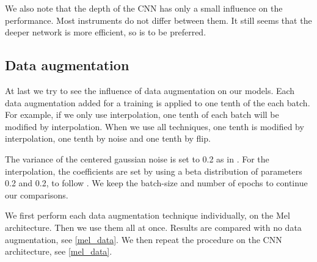 \documentclass[final]{cvpr}
\begin{document}
We also note that the depth of the CNN has only a small influence on the performance. Most instruments do not differ between them. It still seems that the deeper network is more efficient, so is to be preferred.
\subsection{Data augmentation}
At last we try to see the influence of data augmentation on our models. Each data augmentation added for a training is applied to one tenth of the each batch. For example, if we only use interpolation, one tenth of each batch will be modified by interpolation. When we use all techniques, one tenth is modified by interpolation, one tenth by noise and one tenth by flip.

The variance of the centered gaussian noise is set to 0.2 as in \cite{data_aug}. For the interpolation, the coefficients are set by using a beta distribution of parameters 0.2 and 0.2, to follow \cite{squelette_progr}. We keep the batch-size and number of epochs to continue our comparisons.

We first perform each data augmentation technique individually, on the Mel architecture. Then we use them all at once. Results are compared with no data augmentation, see \ref{mel_data}. We then repeat the procedure on the CNN architecture, see \ref{mel_data}.
\end{document}
